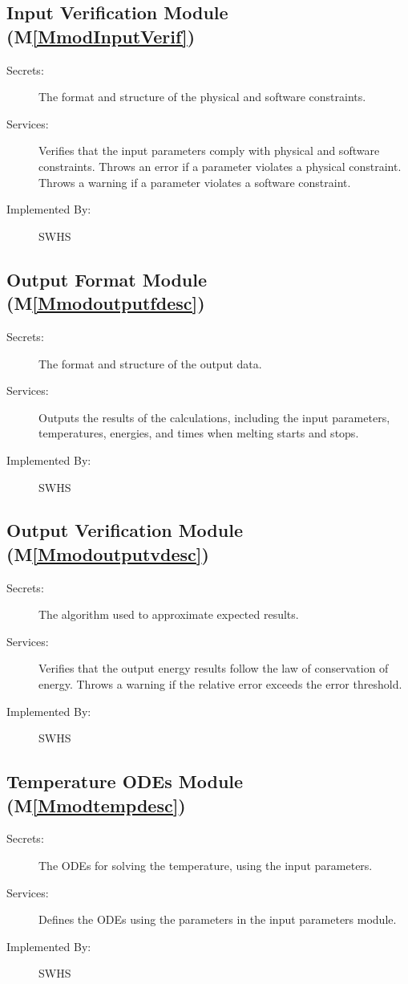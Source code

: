 \documentclass[12pt]{article}
\begin{document}
\subsection{Input Verification Module (M\ref{MmodInputVerif})}
\label{Sec:InpuVeriModu()}
\begin{description}
\item[Secrets:]The format and structure of the physical and software constraints.
\item[Services:]Verifies that the input parameters comply with physical and software constraints. Throws an error if a parameter violates a physical constraint. Throws a warning if a parameter violates a software constraint.
\item[Implemented By:]SWHS
\end{description}
\subsection{Output Format Module (M\ref{Mmodoutputfdesc})}
\label{Sec:OutpFormModu()}
\begin{description}
\item[Secrets:]The format and structure of the output data.
\item[Services:]Outputs the results of the calculations, including the input parameters, temperatures, energies, and times when melting starts and stops.
\item[Implemented By:]SWHS
\end{description}
\subsection{Output Verification Module (M\ref{Mmodoutputvdesc})}
\label{Sec:OutpVeriModu()}
\begin{description}
\item[Secrets:]The algorithm used to approximate expected results.
\item[Services:]Verifies that the output energy results follow the law of conservation of energy. Throws a warning if the relative error exceeds the error threshold.
\item[Implemented By:]SWHS
\end{description}
\subsection{Temperature ODEs Module (M\ref{Mmodtempdesc})}
\label{Sec:TempODEsModu()}
\begin{description}
\item[Secrets:]The ODEs for solving the temperature, using the input parameters.
\item[Services:]Defines the ODEs using the parameters in the input parameters module.
\item[Implemented By:]SWHS
\end{description}
\end{document}
